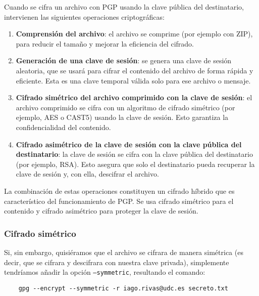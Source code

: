 Cuando se cifra un archivo con PGP usando la clave pública del destinatario, intervienen las siguientes operaciones criptográficas:
\begin{enumerate}
    \item \textbf{Comprensión del archivo}: el archivo se comprime (por ejemplo con ZIP), para reducir el tamaño y mejorar la eficiencia del cifrado.
    \item \textbf{Generación de una clave de sesión}: se genera una clave de sesión aleatoria, que se usará para cifrar el contenido del archivo de forma rápida y eficiente. Esta es una clave temporal válida solo para ese archivo o mensaje.
    \item \textbf{Cifrado simétrico del archivo comprimido con la clave de sesión}: el archivo comprimido se cifra con un algoritmo de cifrado simétrico (por ejemplo, AES o CAST5) usando la clave de sesión. Esto garantiza la confidencialidad del contenido.
    \item \textbf{Cifrado asimétrico de la clave de sesión con la clave pública del destinatario}: la clave de sesión se cifra con la clave pública del destinatario (por ejemplo, RSA). Esto asegura que solo el destinatario pueda recuperar la clave de sesión y, con ella, descifrar el archivo.
\end{enumerate}

La combinación de estas operaciones constituyen un cifrado híbrido que es característico del funcionamiento de PGP. Se usa cifrado simétrico para el contenido y cifrado asimétrico para proteger la clave de sesión.

\subsubsection{Cifrado simétrico}

Si, sin embargo, quisiéramos que el archivo se cifrara de manera simétrica (es decir, que se cifrara y descifrara con nuestra clave privada), simplemente tendríamos añadir la opción \texttt{--symmetric}, resultando el comando:

\begin{verbatim}
    gpg --encrypt --symmetric -r iago.rivas@udc.es secreto.txt
\end{verbatim}
